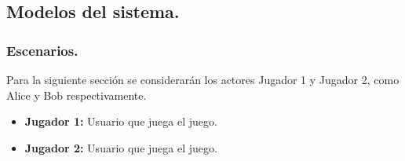 
\subsection{Modelos del sistema.}\label{cap:modelos-sistema}

\subsubsection{Escenarios.}\label{cap:escenarios}
Para la siguiente sección se considerarán los actores Jugador 1 y Jugador 2, como Alice y Bob respectivamente.
\begin{itemize}
    \item \textbf{Jugador 1:} Usuario que juega el juego.
    \item \textbf{Jugador 2:} Usuario que juega el juego.
\end{itemize}

